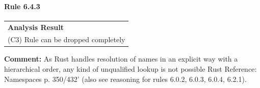 \paragraph{Rule 6.4.3}
\begin{longtable}{p{13cm}}
\textbf{Analysis Result} \\
(C3) Rule can be dropped completely \\
\end{longtable}
\textbf{Comment:} As Rust handles resolution of names in an explicit way with a hierarchical order, any kind of unqualified lookup is not possible Rust Reference: Namespaces p. 350/432' (also see reasoning for rules 6.0.2, 6.0.3, 6.0.4, 6.2.1). \\
